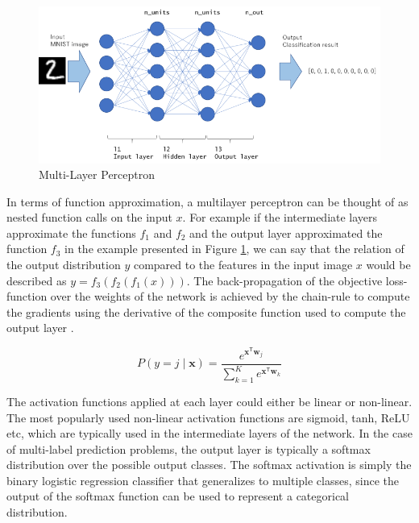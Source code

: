 \begin{figure}[ht]
	\centering
	\includegraphics[width=\textwidth]{images/mlp-network}
	\caption{\label{fig:mlp-network} Multi-Layer Perceptron}
\end{figure}

In terms of function approximation, a multilayer perceptron can be thought of as nested function calls on the input $x$. For example if the intermediate layers approximate the functions $f_1$ and $f_2$ and the output layer approximated the function $f_3$ in the example presented in Figure \ref{fig:mlp-network}, we can say that the relation of the output distribution $y$ compared to the features in the input image $x$ would be described as $y = f_3(f_2(f_1(x)))$. The back-propagation of the objective loss-function over the weights of the network is achieved by the chain-rule to compute the gradients using the derivative of the composite function used to compute the output layer \citep{lecun1989backpropagation}.

\begin{equation}
	P(y=j \mid \mathbf{x}) = \frac{e^{\mathbf{x}^\mathsf{T}\mathbf{w}_j}}{\sum_{k=1}^K e^{\mathbf{x}^\mathsf{T}\mathbf{w}_k}}
\end{equation}

The activation functions applied at each layer could either be linear or non-linear. The most popularly used non-linear activation functions are sigmoid, tanh, ReLU etc, which are typically used in the intermediate layers of the network. In the case of multi-label prediction problems, the output layer is typically a softmax distribution over the possible output classes. The softmax activation is simply the binary logistic regression classifier that generalizes to multiple classes, since the output of the softmax function can be used to represent a categorical distribution.

